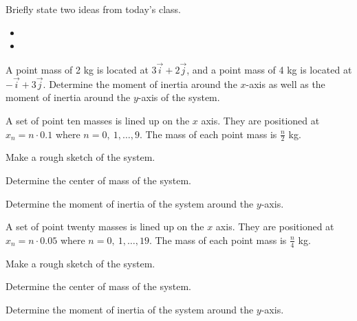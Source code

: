 \postClass

\begin{problem}
\item Briefly state two ideas from today's class.
  \begin{itemize}
  \item 
  \item 
  \end{itemize}
\item 
  \begin{subproblem}
    \item
  \end{subproblem}
\end{problem}


\begin{problem}
\item A point mass of 2 kg is located at $3\vec{i} + 2\vec{j}$, and a
  point mass of 4 kg is located at $-\vec{i}+3\vec{j}$. Determine the
  moment of inertia around the $x$-axis as well as the moment of
  inertia around the $y$-axis  of the system.

  \vfill

\end{problem}


\begin{problem}
\item A set of point ten masses is lined up on the $x$ axis. They are
  positioned at $x_n=n\cdot 0.1$ where $n=0,~1,\ldots,9$. The mass of
  each point mass is $\frac{n}{2}$ kg.
  \begin{subproblem}
    \item Make a rough sketch of the system.
      \vfill
    \item Determine the center of mass of the system.
      \vfill
    \item Determine the moment of inertia of the system around the
      $y$-axis.
      \vfill
  \end{subproblem}

  \clearpage

\item A set of point twenty masses is lined up on the $x$ axis. They
  are positioned at $x_n=n\cdot 0.05$ where $n=0,~1,\ldots,19$. The
  mass of each point mass is $\frac{n}{4}$ kg.
  \begin{subproblem}
    \item Make a rough sketch of the system.
      \vfill
    \item Determine the center of mass of the system.
      \vfill
    \item Determine the moment of inertia of the system around the
      $y$-axis.
      \vfill
  \end{subproblem}

\end{problem}

